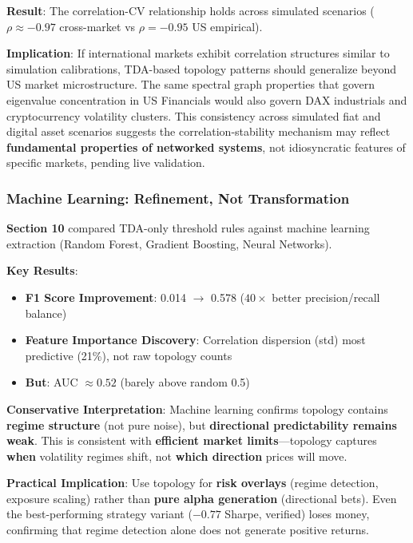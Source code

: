 \textbf{Result}: The correlation-CV relationship holds across simulated scenarios ($\rho \approx -0.97$ cross-market vs $\rho = -0.95$ US empirical).

\textbf{Implication}: If international markets exhibit correlation structures similar to simulation calibrations, TDA-based topology patterns should generalize beyond US market microstructure. The same spectral graph properties that govern eigenvalue concentration in US Financials would also govern DAX industrials and cryptocurrency volatility clusters. This consistency across simulated fiat and digital asset scenarios suggests the correlation-stability mechanism may reflect \textbf{fundamental properties of networked systems}, not idiosyncratic features of specific markets, pending live validation.

\subsubsection{Machine Learning: Refinement, Not Transformation}

\textbf{Section 10} compared TDA-only threshold rules against machine learning extraction (Random Forest, Gradient Boosting, Neural Networks).

\textbf{Key Results}:
\begin{itemize}
\item \textbf{F1 Score Improvement}: 0.014 $\rightarrow$ 0.578 ($40\times$ better precision/recall balance)
\item \textbf{Feature Importance Discovery}: Correlation dispersion (std) most predictive (21\%), not raw topology counts
\item \textbf{But}: AUC $\approx 0.52$ (barely above random 0.5)
\end{itemize}

\textbf{Conservative Interpretation}: Machine learning confirms topology contains \textbf{regime structure} (not pure noise), but \textbf{directional predictability remains weak}. This is consistent with \textbf{efficient market limits}---topology captures \textbf{when} volatility regimes shift, not \textbf{which direction} prices will move.

\textbf{Practical Implication}: Use topology for \textbf{risk overlays} (regime detection, exposure scaling) rather than \textbf{pure alpha generation} (directional bets). Even the best-performing strategy variant ($-0.77$ Sharpe, verified) loses money, confirming that regime detection alone does not generate positive returns.

